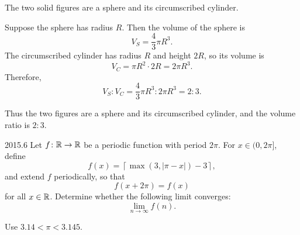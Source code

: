     \begin{solution}
        The two solid figures are a sphere and its circumscribed cylinder.

        Suppose the sphere has radius $R$. Then the volume of the sphere is
        \[
            V_S=\frac{4}{3}\pi R^3.
        \]
        The circumscribed cylinder has radius $R$ and height $2R$, so its volume is
        \[
            V_C=\pi R^2\cdot 2R=2\pi R^3.
        \]
        Therefore,
        \[
            V_S:V_C
            =
            \frac{4}{3}\pi R^3:2\pi R^3
            =
            2:3.
        \]

        Thus the two figures are a sphere and its circumscribed cylinder, and the volume ratio is
        $\boxed{2:3}$.
    \end{solution}

    \begin{pastproblem}{2015.6}
        Let $f\colon\mathbb{R}\to\mathbb{R}$ be a periodic function with period $2\pi$. For $x\in(0,2\pi]$, define
        \[
            f(x)
            =
            \left\lceil
                \max(3,|\pi-x|)-3
            \right\rceil,
        \]
        and extend $f$ periodically, so that
        \[
            f(x+2\pi)=f(x)
        \]
        for all $x\in\mathbb{R}$. Determine whether the following limit converges:
        \[
            \lim\limits_{n\to\infty} f(n).
        \]

        \begin{hint}
            Use $3.14<\pi<3.145$.
        \end{hint}
    \end{pastproblem}

